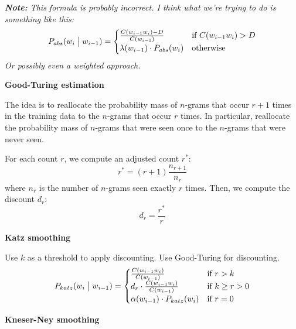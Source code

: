 \vspace{10pt}

\textit{\textbf{Note:} This formula is probably incorrect. I think what we're trying to do is something like this:
    \begin{equation*}
        P_{abs}(w_i \bigm| w_{i-1}) = \begin{cases}
            \frac{C(w_{i-1}w_i) - D}{C(w_{i-1})} & \mbox{if } C(w_{i-1}w_i) > D \\
            \lambda(w_{i-1}) \cdot P_{abs}(w_i) & \mbox{otherwise}
        \end{cases}
    \end{equation*}
    Or possibly even a weighted approach.
}

\vspace{20pt}
\textbf{Good-Turing estimation}
\vspace{10pt}

The idea is to reallocate the probability mass of $n$-grams that occur $r+1$ times in the training data to the $n$-grams that occur $r$ times. In particular, reallocate the probability mass of $n$-grams that were seen once to the $n$-grams that were never seen.

For each count $r$, we compute an adjusted count $r^\ast$:
\[
    r^\ast = (r+1)\frac{n_{r+1}}{n_r}
\]
where $n_r$ is the number of $n$-grams seen exactly $r$ times. Then, we compute the discount $d_r$:
\[
    d_r = \frac{r^\ast}{r}
\]

\vspace{20pt}
\textbf{Katz smoothing}
\vspace{10pt}

Use $k$ as a threshold to apply discounting. Use Good-Turing for discounting.
\begin{equation*}
    P_{katz}(w_i \bigm| w_{i-1}) = \begin{cases}
                                       \frac{C(w_{i-1}w_i)}{C(w_{i-1})} & \mbox{if } r > k \\
                                       d_r \cdot \frac{C(w_{i-1}w_i)}{C(w_{i-1})} & \mbox{if } k \geq r > 0 \\
                                       \alpha(w_{i-1}) \cdot P_{katz}(w_{i}) & \mbox{if } r = 0
                                   \end{cases}
\end{equation*}

\vspace{20pt}
\textbf{Kneser-Ney smoothing}
\vspace{10pt}

